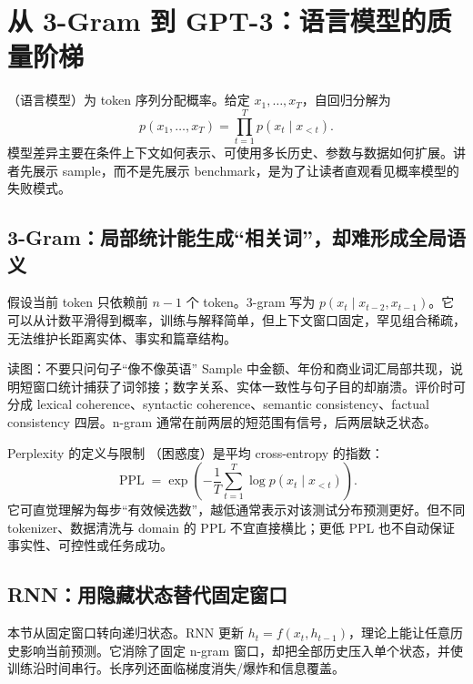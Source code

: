 \section{从 3-Gram 到 GPT-3：语言模型的质量阶梯}

（语言模型）为 token 序列分配概率。给定 $x_1,\ldots,x_T$，自回归分解为
\[
p(x_1,\ldots,x_T)=\prod_{t=1}^{T}p(x_t\mid x_{<t}).
\]
模型差异主要在条件上下文如何表示、可使用多长历史、参数与数据如何扩展。讲者先展示 sample，而不是先展示 benchmark，是为了让读者直观看见概率模型的失败模式。

\subsection{3-Gram：局部统计能生成“相关词”，却难形成全局语义}

 假设当前 token 只依赖前 $n-1$ 个 token。3-gram 写为 $p(x_t\mid x_{t-2},x_{t-1})$。它可以从计数平滑得到概率，训练与解释简单，但上下文窗口固定，罕见组合稀疏，无法维护长距离实体、事实和篇章结构。


\begin{knowledgebox}{读图：不要只问句子“像不像英语”}
Sample 中金额、年份和商业词汇局部共现，说明短窗口统计捕获了词邻接；数字关系、实体一致性与句子目的却崩溃。评价时可分成 lexical coherence、syntactic coherence、semantic consistency、factual consistency 四层。n-gram 通常在前两层的短范围有信号，后两层缺乏状态。
\end{knowledgebox}

\begin{knowledgebox}{Perplexity 的定义与限制}
（困惑度）是平均 cross-entropy 的指数：
\[
\operatorname{PPL}=\exp\!\left(-\frac{1}{T}\sum_{t=1}^{T}\log p(x_t\mid x_{<t})\right).
\]
它可直觉理解为每步“有效候选数”，越低通常表示对该测试分布预测更好。但不同 tokenizer、数据清洗与 domain 的 PPL 不宜直接横比；更低 PPL 也不自动保证事实性、可控性或任务成功。
\end{knowledgebox}

\subsection{RNN：用隐藏状态替代固定窗口}

本节从固定窗口转向递归状态。RNN 更新 $h_t=f(x_t,h_{t-1})$，理论上能让任意历史影响当前预测。它消除了固定 n-gram 窗口，却把全部历史压入单个状态，并使训练沿时间串行。长序列还面临梯度消失/爆炸和信息覆盖。

